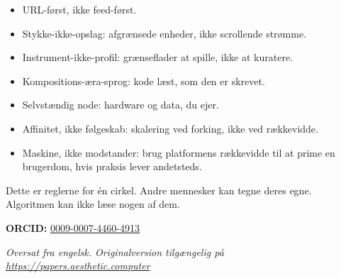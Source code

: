 \documentclass[10pt,letterpaper,twocolumn]{article}
\begin{document}
\begin{itemize}
  \item URL-først, ikke feed-først.
  \item Stykke-ikke-opslag: afgrænsede enheder, ikke scrollende strømme.
  \item Instrument-ikke-profil: grænseflader at spille, ikke at kuratere.
  \item Kompositions-æra-sprog: kode læst, som den er skrevet.
  \item Selvstændig node: hardware og data, du ejer.
  \item Affinitet, ikke følgeskab: skalering ved forking, ikke ved rækkevidde.
  \item Maskine, ikke modstander: brug platformens rækkevidde til at prime en brugerdom, hvis praksis lever andetsteds.
\end{itemize}

Dette er reglerne for én cirkel. Andre mennesker kan tegne deres egne. Algoritmen kan ikke læse nogen af dem.

\vspace{0.5em}
\noindent\textbf{ORCID:} \href{https://orcid.org/0009-0007-4460-4913}{0009-0007-4460-4913}

\vspace{0.5em}
\noindent\textit{Oversat fra engelsk. Originalversion tilg{\ae}ngelig p{\aa} \url{https://papers.aesthetic.computer}}



\end{document}
